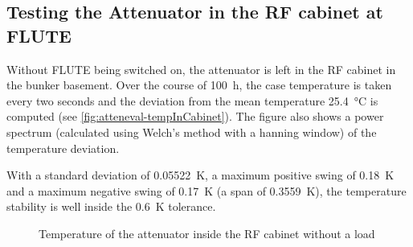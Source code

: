 \FloatBarrier
\subsection{Testing the Attenuator in the RF cabinet at FLUTE}
Without FLUTE being switched on, the attenuator is left in the RF cabinet in the bunker basement. Over the course of \SI{100}{\hour}, the case temperature is taken every two seconds and the deviation from the mean temperature \SI{25.4}{\degreeCelsius} is computed (see \autoref{fig:atteneval-tempInCabinet}). The figure also shows a power spectrum (calculated using Welch's method with a hanning window) of the temperature deviation.

With a standard deviation of \SI{0.05522}{\kelvin}, a maximum positive swing of \SI{0.18}{\kelvin} and a maximum negative swing of \SI{0.17}{\kelvin} (a span of \SI{0.3559}{\kelvin}), the temperature stability is well inside the \SI{0.6}{\kelvin} tolerance.

\begin{figure}[tb]
		\hfill
        \subfloat[Time]{}
        
        \hfill
       \caption{Temperature of the attenuator inside the RF cabinet without a load}
    \label{fig:atteneval-tempInCabinet}
\end{figure}

